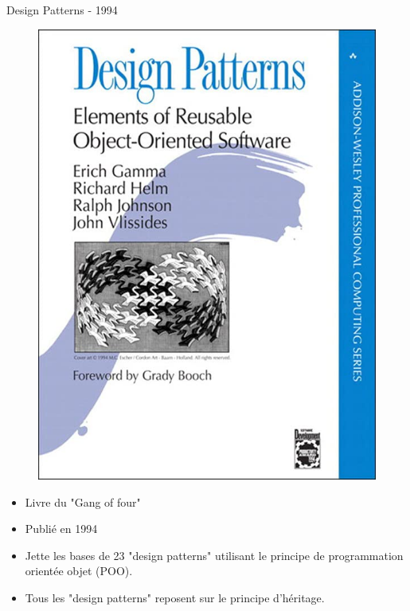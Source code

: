 \documentclass[french]{beamer}
\begin{document}
\begin{frame}{Design Patterns - 1994}
    \begin{minipage}{0.4\linewidth}
    \begin{figure}
        \includegraphics[width=\linewidth]{gof_book.jpg}
    \end{figure}
    \end{minipage}
    \begin{minipage}{0.5\linewidth}
        \begin{itemize}
            \item Livre du "Gang of four"
            \item Publié en 1994
            \item Jette les bases de 23 "design patterns" utilisant le principe de programmation orientée objet (POO).
            \item Tous les "design patterns" reposent sur le principe d'héritage.
        \end{itemize}
    \end{minipage}
\end{frame}
\end{document}
